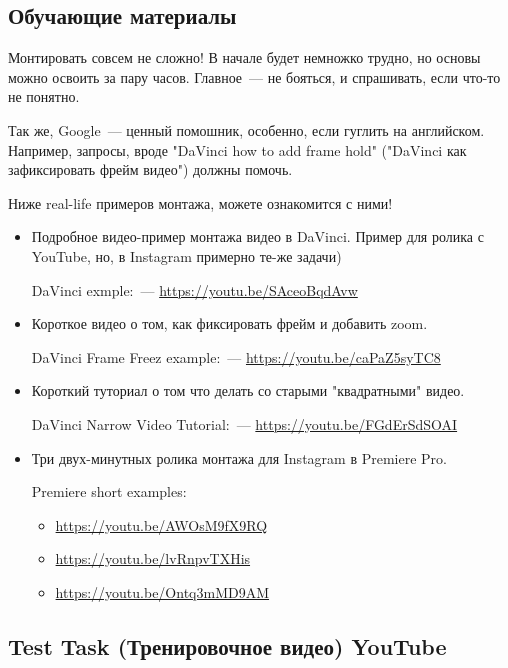 \documentclass[
a4paper, %
12pt, %
article,
onecolumn, %
openany, %
]{memoir}
\begin{document}
\subsection{Обучающие материалы}

Монтировать совсем не сложно! В начале будет немножко трудно, но основы можно 
освоить за пару часов. Главное~--- не бояться, и спрашивать, если что-то не понятно.

Так же, Google~--- ценный помошник, особенно, если гуглить на английском.
Например, запросы, вроде 
"DaVinci how to add frame hold" ("DaVinci как зафиксировать фрейм видео")
должны помочь.

Ниже real-life примеров монтажа, можете ознакомится с ними!
\begin{itemize}
    \item Подробное видео-пример монтажа видео в DaVinci. 
        Пример для ролика с YouTube, но, в 
        Instagram примерно те-же задачи)
        
        DaVinci exmple:~--- \href{https://youtu.be/SAceoBqdAvw}{https://youtu.be/SAceoBqdAvw}
    \item Короткое видео о том, как фиксировать фрейм и добавить zoom.

        DaVinci Frame Freez example:~--- \href{https://youtu.be/caPaZ5syTC8}{https://youtu.be/caPaZ5syTC8}
    \item Короткий туториал о том что делать со старыми "квадратными" видео. 

        DaVinci Narrow Video Tutorial:~--- \href{https://youtu.be/FGdErSdSOAI}{https://youtu.be/FGdErSdSOAI}

\item Три двух-минутных ролика монтажа для Instagram в Premiere Pro.

    Premiere short examples:
    \begin{itemize}
        \item \href{https://youtu.be/AWOsM9fX9RQ}{https://youtu.be/AWOsM9fX9RQ}
        \item \href{https://youtu.be/lvRnpvTXHis}{https://youtu.be/lvRnpvTXHis}
        \item \href{https://youtu.be/Ontq3mMD9AM}{https://youtu.be/Ontq3mMD9AM}
    \end{itemize}
\end{itemize}


\subsection{Test Task (Тренировочное видео) YouTube}
 
\end{document}
